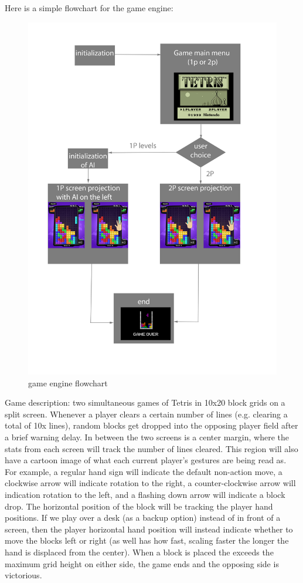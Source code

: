 \documentclass{article}
\begin{document}
	\newpage
	Here is a simple flowchart for the game engine:\\
	\begin{figure}[h!]
	\centering\includegraphics[scale=0.55]{tetrisproject}
	\caption{game engine flowchart}
	\end{figure}
	\newpage
	Game description: two simultaneous games of Tetris in 10x20 block grids on a split screen. Whenever a player clears a certain number of lines (e.g. clearing a total of 10x lines), random blocks get dropped into the opposing player field after a brief warning delay. In between the two screens is a center margin, where the stats from each screen will track the number of lines cleared. This region will also have a cartoon image of what each current player’s gestures are being read as. For example, a regular hand sign will indicate the default non-action move, a clockwise arrow will indicate rotation to the right, a counter-clockwise arrow will indication rotation to the left, and a flashing down arrow will indicate a block drop. The horizontal position of the block will be tracking the player hand positions. If we play over a desk (as a backup option) instead of in front of a screen, then the player horizontal hand position will instead indicate whether to move the blocks left or right (as well has how fast, scaling faster the longer the hand is displaced from the center). When a block is placed the exceeds the maximum grid height on either side, the game ends and the opposing side is victorious.\\ 
	
\end{document}
